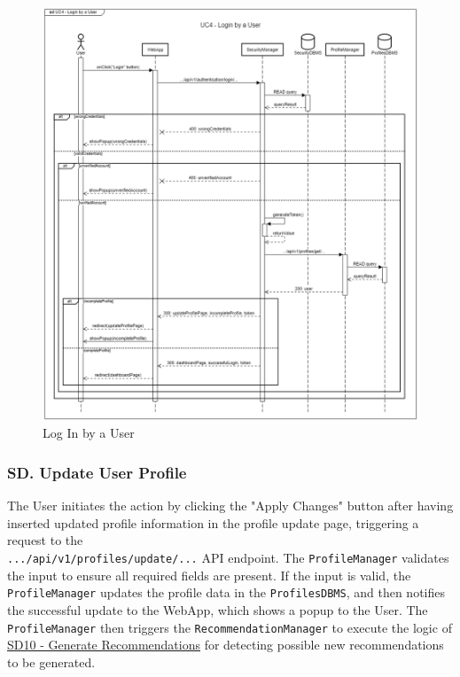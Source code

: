 \begin{figure}[H]
    \begin{center}
         \includegraphics[width=0.8\linewidth]{LaTeXCode/images/SequenceDiagrams/UC4-sequenceDiagram.png}
         \caption{Log In by a User}
         \label{fig:login_user_sd}
     \end{center}
\end{figure}

\subsubsection*{SD\cuc. Update User Profile}
\label{subsubsec:update_profile_sd}
The User initiates the action by clicking the "Apply Changes" button after having inserted updated profile information in the profile update page, triggering a request to the \\ \texttt{.../api/v1/profiles/update/...} API endpoint. The \texttt{ProfileManager} validates the input to ensure all required fields are present.
If the input is valid, the \texttt{ProfileManager} updates the profile data in the \texttt{ProfilesDBMS}, and then notifies the successful update to the WebApp, which shows a popup to the User. The \texttt{ProfileManager} then triggers the \texttt{RecommendationManager} to execute the logic of \hyperref[fig:generate_recommendations_sd]{\protect\uline{SD10 - Generate Recommendations}} for detecting possible new recommendations to be generated.

